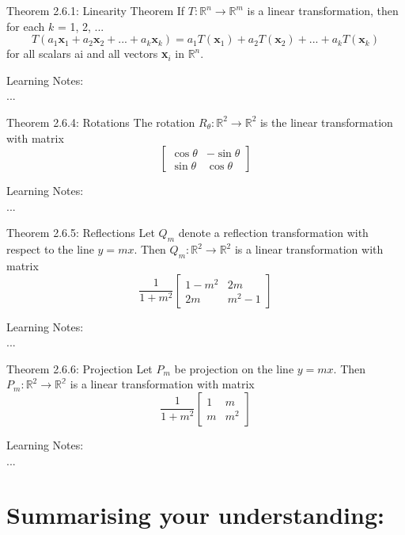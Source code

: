 \documentclass[
  12pt,
  a4paper,
]{article}
\begin{document}
\begin{box_purple}{Theorem 2.6.1: Linearity Theorem }
If $T : \mathbb{R}^n \xrightarrow{} \mathbb{R}^m$ is a linear transformation, then for each $k$ = 1, 2, ...
$$T(a_1\textbf{x}_1+a_2\textbf{x}_2+...+a_k\textbf{x}_k) =a_1T(\textbf{x}_1)+a_2T(\textbf{x}_2)+...+a_kT(\textbf{x}_k)$$
for all scalars ai and all vectors \textbf{x}$_i$ in $\mathbb{R}^n$.
\end{box_purple}
\noindent
Learning Notes:
\\...

\begin{box_purple}{Theorem 2.6.4: Rotations}
The rotation $R_\theta : \mathbb{R}^2 \xrightarrow{} \mathbb{R}^2$ is the linear transformation with matrix
$$\begin{bmatrix}
    \cos\theta & -\sin\theta \\
    \sin\theta & \cos\theta
\end{bmatrix}$$
\end{box_purple}
\noindent
Learning Notes:
\\...

\begin{box_purple}{Theorem 2.6.5: Reflections}
Let $Q_m$ denote a reflection transformation with respect to the line $y = mx$. Then $Q_m : \mathbb{R}^2 \xrightarrow{} \mathbb{R}^2$ is a linear transformation with matrix 
$$\frac{1}{1+m^2}\begin{bmatrix}
    1-m^2 & 2m \\
    2m & m^2-1
\end{bmatrix}$$
\end{box_purple}
\noindent
Learning Notes:
\\...

\begin{box_purple}{Theorem 2.6.6: Projection}
Let $P_m$ be projection on the line $y = mx$. Then $P_m : \mathbb{R}^2 \xrightarrow{} \mathbb{R^2}$ is a linear transformation with matrix 
$$\frac{1}{1+m^2}\begin{bmatrix}
    1 & m \\
    m & m^2
\end{bmatrix}$$
\end{box_purple}
\noindent
Learning Notes:
\\...

\section*{Summarising your understanding: }
\end{document}
